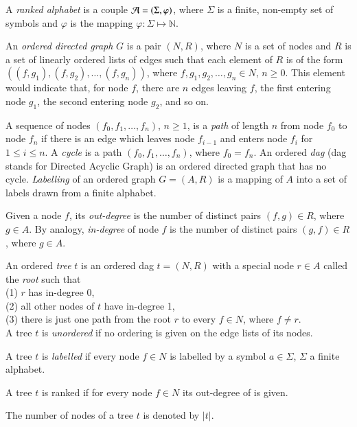 \documentclass[preprint,12pt]{elsarticle}
\begin{document}
A \emph{ranked alphabet} is a couple ${\cal A} = ( \Sigma, \varphi)$, where $\Sigma$ 
is a finite, non-empty set of symbols and $\varphi$ is the mapping 
$\varphi : \Sigma \mapsto \mathbb{N}$.

An \emph{ordered directed graph} $G$ is a pair $(N, R)$, where $N$ is a set of 
nodes and $R$ is a set of linearly ordered lists of edges such that each 
element of $R$ is of the form $((f, g_1), (f, g_2),\ldots , (f, g_n))$, where 
$f, g_1, g_2, \ldots, g_n \in N$, $n \geq 0$. This element would indicate that, 
for node $f$, there are $n$ edges leaving $f$, the first entering node $g_1$, 
the second entering node $g_2$, and so on.

A sequence of nodes $(f_0, f_1, \ldots,f_n)$, $n \geq 1$, is a \emph{path} of 
length $n$ from node $f_0$ to node $f_n$ if there is an edge which leaves node 
$f_{i-1}$ and enters node $f_i$ for $1 \leq i \leq n$. A \emph{cycle} is a path 
$(f_0, f_1, \ldots,f_n)$, where $f_0 = f_n$. An ordered \emph{dag} (dag stands 
for Directed Acyclic Graph) is an ordered directed graph that has no cycle.
\emph{Labelling} of an ordered graph $G = (A, R)$ is a mapping of $A$ into a 
set of labels drawn from a finite alphabet.

Given a node $f$, its \emph{out-degree} is the number of distinct pairs 
$(f, g) \in R$, where $g \in A$. By analogy, \emph{in-degree} of node $f$ is 
the number of distinct pairs $(g,f) \in R$, where $g \in A$.

An ordered \emph {tree} $t$ is an ordered dag $t = (N, R)$ with a special node $r\in A$ 
called the \emph{root} such that\\
(1) $r$ has in-degree $0$,\\
(2) all other nodes of $t$ have in-degree 1,\\
(3) there is just one path from the root $r$ to every $f\in N$, where 
$f \neq r$.\\

A tree $t$ is \emph{unordered} if no ordering is given on the edge lists of its nodes.

A tree $t$ is \emph{labelled} if every node $f \in N$ is labelled by a symbol $a \in \Sigma$, $\Sigma$ a finite alphabet. 

A tree $t$ is ranked if for every node $f\in N$ its out-degree of is given.

The number of nodes of a tree $t$ is denoted by $|t|$.
\end{document}
